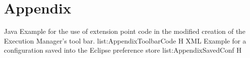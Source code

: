 \appendix
\chapter{Appendix}
\label{chapter:AppendixA}
\listingjava
{}
{Java}
{Example for the use of extension point code in the modified creation of the Execution Manager's tool bar.}
{list:AppendixToolbarCode}
{H}
\label{chapter:AppendixB}
\listingxml
{}
{XML}
{Example for a configuration saved into the Eclipse preference store}
{list:AppendixSavedConf}
{H}

